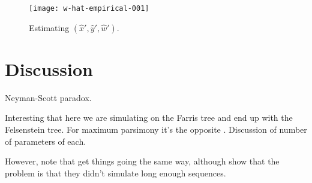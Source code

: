 \begin{figure}
\centering
\texttt{[image: w-hat-empirical-001]}
\caption{
    Estimating $(\hat{x}', \hat{y}', \hat{w}')$.
}
\label{fig:bl-general-inconsistency}
\end{figure}

\section{Discussion}

Neyman-Scott paradox.

Interesting that here we are simulating on the Farris tree and end up with the Felsenstein tree.
For maximum parsimony it's the opposite \cite{Felsenstein1978-rr}.
Discussion of number of parameters of each.

However, note that \cite{Siddall1998-hq} get things going the same way, although \cite{Swofford2001-hr} show that the problem is that they didn't simulate long enough sequences.

